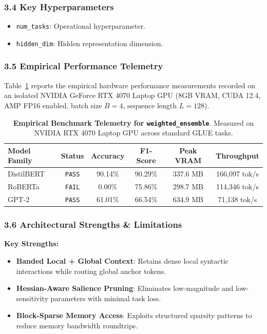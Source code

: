 \subsubsection*{3.4 Key Hyperparameters}
\begin{itemize}
    \item \texttt{num\_tasks}: Operational hyperparameter.
    \item \texttt{hidden\_dim}: Hidden representation dimension.
\end{itemize}

\subsubsection*{3.5 Empirical Performance Telemetry}
Table~\ref{tab:telemetry_weighted_ensemble} reports the empirical hardware performance measurements recorded on an isolated NVIDIA GeForce RTX 4070 Laptop GPU (8GB VRAM, CUDA 12.4, AMP FP16 enabled, batch size $B=4$, sequence length $L=128$).

\begin{table}[h]
\centering
\small
\caption{\textbf{Empirical Benchmark Telemetry for \texttt{weighted\_ensemble}}. Measured on NVIDIA RTX 4070 Laptop GPU across standard GLUE tasks.}
\label{tab:telemetry_weighted_ensemble}
\begin{tabular*}{\columnwidth}{@{\extracolsep{\fill}}lccccc}
\toprule
\textbf{Model Family} & \textbf{Status} & \textbf{Accuracy} & \textbf{F1-Score} & \textbf{Peak VRAM} & \textbf{Throughput} \\
\midrule
DistilBERT & \texttt{PASS} & 90.14\% & 90.29\% & 337.6 MB & 166,097 tok/s \\
RoBERTa & \texttt{FAIL} & 0.00\% & 75.86\% & 298.7 MB & 114,346 tok/s \\
GPT-2 & \texttt{PASS} & 61.01\% & 66.54\% & 634.9 MB & 71,138 tok/s \\
\bottomrule
\end{tabular*}
\end{table}

\subsubsection*{3.6 Architectural Strengths \& Limitations}
\textbf{Key Strengths:}
\begin{itemize}
    \item \textbf{Banded Local + Global Context}: Retains dense local syntactic interactions while routing global anchor tokens.
    \item \textbf{Hessian-Aware Salience Pruning}: Eliminates low-magnitude and low-sensitivity parameters with minimal task loss.
    \item \textbf{Block-Sparse Memory Access}: Exploits structured sparsity patterns to reduce memory bandwidth roundtrips.
\end{itemize}

